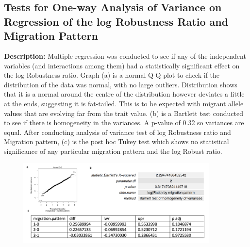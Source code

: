 \documentclass[11pt]{article}
\begin{document}
\begin{appendices}
\newpage

\section{Tests for One-way Analysis of Variance on Regression of the log Robustness Ratio and Migration Pattern}
\textbf{Description:} Multiple regression was conducted to see if any of the independent variables (and interactions among them) had a statistically significant effect on the log Robustness ratio. Graph (a) is a normal Q-Q plot to check if the distribution of the data was normal, with no large outliers. Distribution shows that it is a normal around the centre of the distribution however deviates a little at the ends, suggesting it is fat-tailed. This is to be expected with migrant allele values that are evolving far from the trait value. (b) is a Bartlett test conducted to see if there is homogeneity in the variances. A p-value of 0.32 so variances are equal. After conducting analysis of variance test of log Robustness ratio and Migration pattern, (c) is the post hoc Tukey test which shows no statistical significance of any particular migration pattern and the log Robust ratio.
\begin{figure}[h]
\centering
    \includegraphics[width=0.9\textwidth]{../Results/anova_checks.jpg}
\end{figure}

\end{appendices}
\end{document}
